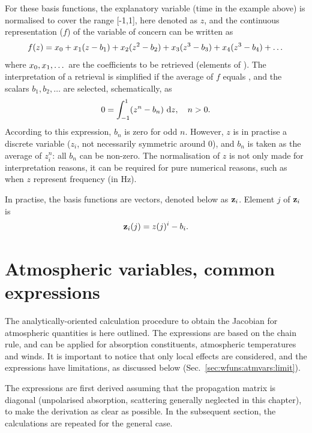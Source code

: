 For these basis functions, the explanatory variable (time in the example above)
is normalised to cover the range [-1,1], here denoted as $z$, and the
continuous representation ($f$) of the variable of concern can be written as
\begin{equation}
  f(z) = x_{0} + x_{1}(z-b_1) + x_{2}(z^2-b_2) + 
                     x_{3}(z^3-b_3) + x_{4}(z^3-b_4) + \dots  
\end{equation}
where $x_{0}, x_{1}, \dots$ are the coefficients to be retrieved
(elements of \SttVct). The interpretation of a retrieval is simplified if the
average of $f$ equals , and the scalars $b_1, b_2, \dots$ are
selected, schematically, as
\begin{equation}
  0 = \int_{-1}^1 \!\left(z^n-b_n\right) \, \mathrm{d} z, \quad n>0.
\end{equation}
According to this expression, $b_n$ is zero for odd $n$. However, $z$ is in
practise a discrete variable ($z_i$, not necessarily symmetric around 0), and
$b_n$ is taken as the average of $z_i^n$: all $b_n$ can be non-zero. The
normalisation of $z$ is not only made for interpretation reasons, it can be
required for pure numerical reasons, such as when $z$ represent frequency (in
Hz).

In practise, the basis functions are vectors, denoted below as $\mathbf{z}_i$.
Element $j$ of $\mathbf{z}_i$ is
\begin{equation}
  \mathbf{z}_i(j) = z(j)^i - b_i.
\end{equation}




\section{Atmospheric variables, common expressions}
\label{sec:wfuns:atmvars}
%
The analytically-oriented calculation procedure to obtain the Jacobian for
atmospheric quantities is here outlined. The expressions are based on the
chain rule, and can be applied for absorption constituents, atmospheric
temperatures and winds. It is important to notice that only local effects are
considered, and the expressions have limitations, as discussed below
(Sec.~\ref{sec:wfuns:atmvars:limit}).

The expressions are first derived assuming that the propagation matrix is
diagonal (unpolarised absorption, scattering generally neglected in this
chapter), to make the derivation as clear as possible. In the subsequent
section, the calculations are repeated for the general case.


